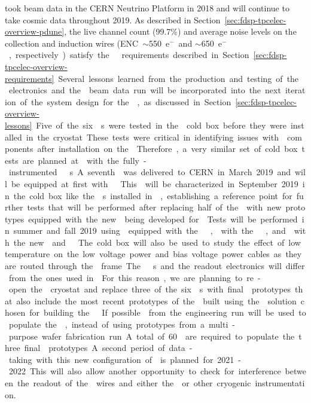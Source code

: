  took beam data in the CERN Neutrino Platform in 2018 and will continue
to take cosmic data throughout 2019. As described in Section~\ref{sec:fdsp-tpcelec-overview-pdune},
the live channel count (99.7\%) and average noise levels on the collection and induction wires 
(ENC~$\sim$\SI{550}{e$^-$} and $\sim$\SI{650}{e$^-$}, respectively) satisfy the  requirements described 
in Section~\ref{sec:fdsp-tpcelec-overview-requirements}. Several lessons learned from the production 
and testing of the  electronics and the  beam data run will be incorporated into the 
next iteration of the system design for the , as discussed in 
Section~\ref{sec:fdsp-tpcelec-overview-lessons}.

Five of the six s were tested in the  cold box
before they were installed in the cryostat. These tests were critical
in identifying issues with  components after installation
on the . Therefore, a very similar set of cold box tests are planned at  
with the fully-instrumented  s. A seventh  was delivered
to CERN in March 2019 and will be equipped at first with  . This
 will be characterized in September 2019 in the cold box like the s installed
in , establishing a reference point for further tests that will be
performed after replacing half of the  with new prototypes equipped with the
new  being developed for . Tests will be performed in summer and
fall 2019 using  equipped with the  , 
with the  , and  with the new  and
 . The cold box will also be used to study the effect of
low temperature on the low voltage power and bias voltage power cables as they are 
routed through the  frame.

The  s and the readout electronics will differ from the ones used 
in . For this reason, we are planning to re-open the  cryostat 
and replace three of the six s with final  prototypes that also include 
the most recent prototypes of the  built using the  solution chosen
for building the  . If possible  from the engineering 
run will be used to populate the , instead of using prototypes from a multi-purpose
wafer fabrication run. A total of \num{60}  are required to populate the three 
final  prototypes. A second period of data-taking 
with this new configuration of  is planned for 2021-2022. This will also 
allow another opportunity to check for interference between the readout of the  
wires and either the  or other cryogenic instrumentation. 

